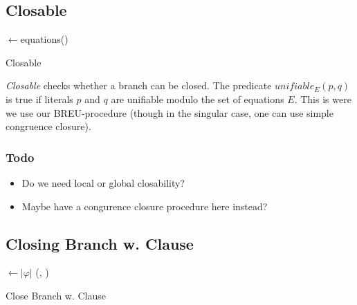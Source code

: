 \documentclass{article}
\begin{document}
\begin{algorithm}[H]

  \SetAlgoLined
  
  }
  \Return \false\;

  \caption{CloseTable}
  \label{alg:close-table}
\end{algorithm}


\subsection{Closable}
\begin{algorithm}[H]

  \SetAlgoLined
  \KwIn{\branch}
  \eqs$\leftarrow$equations(\branch)
  \Return \false\;

  \caption{Closable}
  \label{alg:close-branch-w-clause}
\end{algorithm}



\emph{Closable} checks whether a branch can be closed. The predicate
$unifiable_E(p, q)$ is true if literals $p$ and $q$ are unifiable
modulo the set of equations $E$. This is were we use our
BREU-procedure (though in the singular case, one can use simple
congruence closure).

\subsubsection{Todo}
\begin{itemize}
\item Do we need local or global closability?
\item Maybe have a congurence closure procedure here instead?
\end{itemize}


\subsection{Closing Branch w. Clause}

\begin{algorithm}[H]

  \SetAlgoLined

  \maxstep$\leftarrow |\varphi|$\;  
  \Return (\none, \maxstep)\;

  \caption{Close Branch w. Clause}
  \label{alg:close-branch-w-clause}
\end{algorithm}
\end{document}

